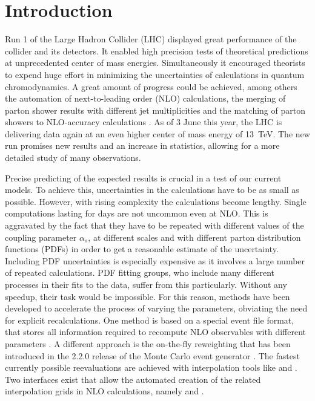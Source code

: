 
\chapter{Introduction}
Run 1 of the Large Hadron Collider (LHC) displayed great performance of the collider and its detectors.
It enabled high precision tests of theoretical predictions at unprecedented center of mass energies.
Simultaneously it encouraged theorists to expend huge effort in minimizing the uncertainties of calculations in quantum chromodynamics.
A great amount of progress could be achieved, among others the automation of next-to-leading order (NLO) calculations, the merging of parton shower results with different jet multiplicities and the matching of parton showers to NLO-accuracy calculations \cite{eventgenerators}.
As of 3 June this year, the LHC is delivering data again at an even higher center of mass energy of \SI{13}{\tera\electronvolt}.
The new run promises new results and an increase in statistics, allowing for a more detailed study of many observations.

Precise predicting of the expected results is crucial in a test of our current models.
To achieve this, uncertainties in the calculations have to be as small as possible.
However, with rising complexity the calculations become lengthy.
Single computations lasting for days are not uncommon even at NLO.
This is aggravated by the fact that they have to be repeated with different values of the coupling parameter $\alpha_s$, at different scales and with different parton distribution functions (PDFs) in order to get a reasonable estimate of the uncertainty.
Including PDF uncertainties is especially expensive as it involves a large number of repeated calculations.
PDF fitting groups, who include many different processes in their fits to the data, suffer from this particularly.
Without any speedup, their task would be impossible.
For this reason, methods have been developed to accelerate the process of varying the parameters, obviating the need for explicit recalculations.
One method is based on a special event file format, that stores all information required to recompute NLO observables with different parameters \cite{ntuples}.
A different approach is the on-the-fly reweighting that has been introduced in the 2.2.0 release of the Monte Carlo event generator \sherpa{} \cite{mcgrid20}.
The fastest currently possible reevaluations are achieved with interpolation tools like \appl{} \cite{applgrid2010} and \fnlo{} \cite{fastnlo2006}.
Two interfaces exist that allow the automated creation of the related interpolation grids in NLO calculations, namely \amcfast{} \cite{amcfast} and \mcgrid{} \cite{mcgrid2013}.

